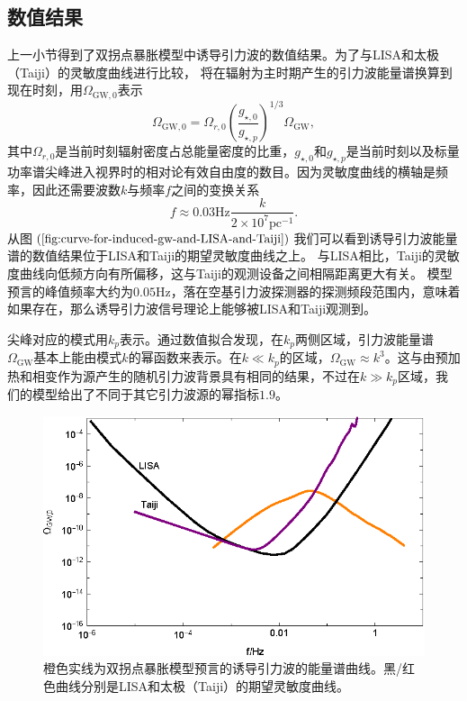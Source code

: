 \subsection{数值结果}
上一小节得到了双拐点暴胀模型中诱导引力波的数值结果。为了与LISA\citep{amaro2017laser}和太极（Taiji）\citep{guo2018taiji}的灵敏度曲线进行比较，
将在辐射为主时期产生的引力波能量谱换算到现在时刻，用$\Omega_{\text{GW},0}$表示
\begin{equation}
  \label{eq:energy-spectrum-of-GW-at-now}
  \Omega_{\text{GW},0} =
  \Omega_{r,0}{\left(\frac{g_{\star,0}}{g_{\star,p}}\right)}^{1
  /3}\Omega_{\text{GW}},
\end{equation}
其中$\Omega_{r,0}$是当前时刻辐射密度占总能量密度的比重，$g_{\star,0}$和$g_{\star,p}$是当前时刻以及标量功率谱尖峰进入视界时的相对论有效自由度的数目。因为灵敏度曲线的横轴是频率，因此还需要波数$k$与频率$f$之间的变换关系
\begin{equation}
  \label{eq:frequency-from-wave-numbers}
  f \approx 0.03\text{Hz} \frac{k}{2\times 10^{7}\text{pc}^{-1}}.
\end{equation}
从图$(\ref{fig:curve-for-induced-gw-and-LISA-and-Taiji})$我们可以看到诱导引力波能量谱的数值结果位于LISA\citep{amaro2017laser}和Taiji\citep{guo2018taiji}的期望灵敏度曲线之上。
与LISA相比，Taiji的灵敏度曲线向低频方向有所偏移，这与Taiji的观测设备之间相隔距离更大有关。
模型预言的峰值频率大约为$0.05\text{Hz}$，落在空基引力波探测器的探测频段范围内，意味着如果存在，那么诱导引力波信号理论上能够被LISA和Taiji观测到。

尖峰对应的模式用$k_{p}$表示。通过数值拟合发现，在$k_{p}$两侧区域，引力波能量谱
$\Omega_{\text{GW}}$基本上能由模式$k$的幂函数来表示。在$k\ll
k_{p}$的区域，$\Omega_{\text{GW}}\approx
k^3$。这与由预加热和相变作为源产生的随机引力波背景具有相同的结果，不过在$k\gg
k_{p}$区域，我们的模型给出了不同于其它引力波源的幂指标$1.9$。

\begin{figure}[!htbp]
  \centering
  \includegraphics[width=6in]{Img/Lisa2.eps}
  \caption{橙色实线为双拐点暴胀模型预言的诱导引力波的能量谱曲线。黑/红色曲线分别是LISA\citep{amaro2017laser}和太极（Taiji）\citep{guo2018taiji}的期望灵敏度曲线。}\label{fig:curve-for-induced-gw-and-LISA-and-Taiji}
\end{figure}

